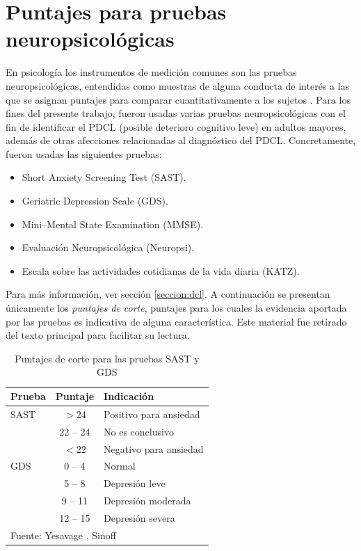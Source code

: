 \documentclass[12pt,letterpaper]{book}
\begin{document}

\chapter{Puntajes para pruebas neuropsicológicas}
\label{apendice_pruebas}

En psicología los instrumentos de medición comunes son las pruebas neuropsicológicas, entendidas como muestras de alguna conducta de interés a las que se asignan puntajes para comparar cuantitativamente a los sujetos \cite{Ardila12}. 
%
Para los fines del presente trabajo, fueron usadas varias pruebas neuropsicológicas con el fin de identificar el PDCL (posible deterioro cognitivo leve) en adultos mayores, además de otras afecciones relacionadas al diagnóstico del PDCL.
%
Concretamente, fueron usadas las siguientes pruebas:
\begin{itemize}
\item {Short Anxiety Screening Test (SAST)}. 
\item {Geriatric Depression Scale (GDS)}.
\item {Mini--Mental State Examination (MMSE)}.
\item {Evaluación Neuropsicológica (Neuropsi)}.
\item {Escala sobre las actividades cotidianas de la vida diaria (KATZ)}.
\end{itemize}

Para más información, ver sección \ref{seccion:dcl}.
%
A continuación se presentan únicamente los \textit{puntajes de corte}, puntajes para los cuales la evidencia aportada por las pruebas es indicativa de alguna característica.
%
Este material fue retirado del texto principal para facilitar su lectura.

\begin{table}
\centering
\caption{Puntajes de corte para las pruebas SAST y GDS}
\begin{tabular}{lcl}
\toprule
Prueba & Puntaje & Indicación \\
\midrule
SAST
& $>24$ & Positivo para ansiedad \\
& 22 -- 24 & No es conclusivo \\
& $<22$ & Negativo para ansiedad \\
\midrule
GDS
& 0 -- 4 & Normal \\
& 5 -- 8 & Depresión leve \\
& 9 -- 11 & Depresión moderada \\
& 12 -- 15 & Depresión severa \\
\bottomrule
\multicolumn{3}{l}{Fuente: Yesavage \cite{Yesavage82}, Sinoff \cite{sinoff99} }
\end{tabular}
\label{anexo:sast_gds}
\end{table}
\end{document}

